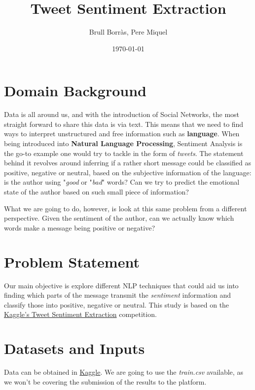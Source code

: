 \documentclass[11pt]{article}
\title{Tweet Sentiment Extraction}
\author{Brull Borràs, Pere Miquel}
\date{\today}
\begin{document}
\maketitle

\section{Domain Background}

Data is all around us, and with the introduction of Social Networks, the most straight forward to share this data is via text. This means that we need to find ways to interpret unstructured and free information such as \textbf{language}. When being introduced into \textbf{Natural Language Processing}, Sentiment Analysis is the go-to example one would try to tackle in the form of \textit{tweets}. The statement behind it revolves around inferring if a rather short message could be classified as positive, negative or neutral, based on the subjective information of the language: is the author using "\textit{good} or "\textit{bad}" words? Can we try to predict the emotional state of the author based on such small piece of information?

What we are going to do, however, is look at this same problem from a different perspective. Given the sentiment of the author, can we actually know which words make a message being positive or negative?

\section{Problem Statement}

Our main objective is explore different NLP techniques that could aid us into finding which parts of the message transmit the \textit{sentiment} information and classify those into positive, negative or neutral. This study is based on the \href{https://www.kaggle.com/c/tweet-sentiment-extraction}{Kaggle's Tweet Sentiment Extraction} competition.

\section{Datasets and Inputs}

Data can be obtained in \href{https://www.kaggle.com/c/tweet-sentiment-extraction/data}{Kaggle}. We are going to use the \textit{train.csv} available, as we won't be covering the submission of the results to the platform.
\end{document}
